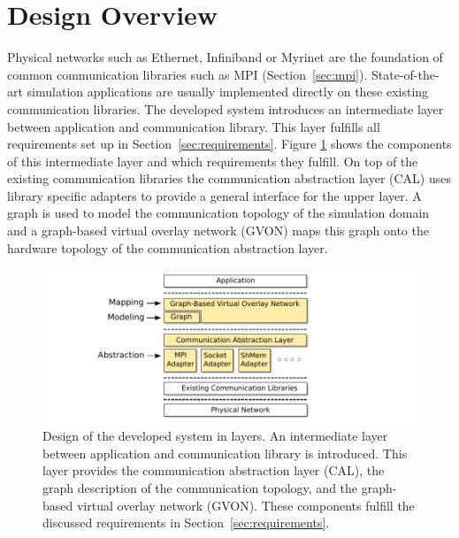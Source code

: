 \section{Design Overview}

Physical networks such as Ethernet, Infiniband or Myrinet are the
foundation of common communication libraries such as MPI
(Section~\ref{sec:mpi}).  State-of-the-art simulation applications are
usually implemented directly on these existing communication
libraries. The developed system introduces an intermediate layer
between application and communication library. This layer fulfills all
requirements set up in Section~\ref{sec:requirements}. Figure
\ref{fig:design} shows the components of this intermediate layer and
which requirements they fulfill.  On top of the existing communication
libraries the communication abstraction layer (CAL) uses library
specific adapters to provide a general interface for the upper layer.  A
graph is used to model the communication topology of the simulation
domain and a graph-based virtual overlay network (GVON) maps this graph onto
the hardware topology of the communication abstraction layer.

\begin{figure}[H]
  \centering \includegraphics[width=\textwidth]{graphics/30_design}
  \caption{Design of the developed system in layers. An intermediate
    layer between application and communication library is introduced.
    This layer provides the communication abstraction layer (CAL), the
    graph description of the communication topology, and the
    graph-based virtual overlay network (GVON). These components
    fulfill the discussed requirements in
    Section~\ref{sec:requirements}.}
  \label{fig:design}
\end{figure}

